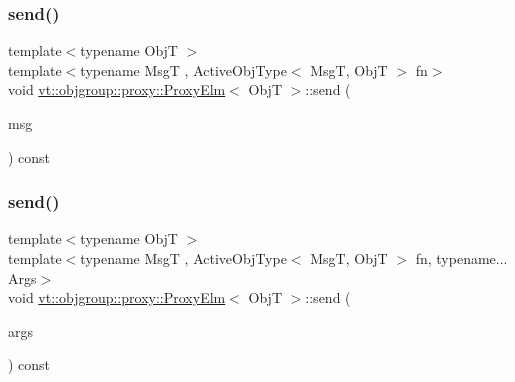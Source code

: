 \subsubsection{\texorpdfstring{send()}{send()}\hspace{0.1cm}{\footnotesize\ttfamily [2/3]}}
{\footnotesize\ttfamily template$<$typename ObjT $>$ \\
template$<$typename MsgT , Active\+Obj\+Type$<$ Msg\+T, Obj\+T $>$ fn$>$ \\
void \hyperlink{structvt_1_1objgroup_1_1proxy_1_1_proxy_elm}{vt\+::objgroup\+::proxy\+::\+Proxy\+Elm}$<$ ObjT $>$\+::send (\begin{DoxyParamCaption}\item[{\hyperlink{namespacevt_ab2b3d506ec8e8d1540aede826d84a239}{Msg\+Shared\+Ptr}$<$ MsgT $>$}]{msg }\end{DoxyParamCaption}) const}

\mbox{\label{structvt_1_1objgroup_1_1proxy_1_1_proxy_elm_aadfbb21b80482657fd2a7eba65ad7b48}} 
\subsubsection{\texorpdfstring{send()}{send()}\hspace{0.1cm}{\footnotesize\ttfamily [3/3]}}
{\footnotesize\ttfamily template$<$typename ObjT $>$ \\
template$<$typename MsgT , Active\+Obj\+Type$<$ Msg\+T, Obj\+T $>$ fn, typename... Args$>$ \\
void \hyperlink{structvt_1_1objgroup_1_1proxy_1_1_proxy_elm}{vt\+::objgroup\+::proxy\+::\+Proxy\+Elm}$<$ ObjT $>$\+::send (\begin{DoxyParamCaption}\item[{Args \&\&...}]{args }\end{DoxyParamCaption}) const}

\mbox{\label{structvt_1_1objgroup_1_1proxy_1_1_proxy_elm_aa2c6be8bfa1113516cd6e8b3d7bd0445}} 
